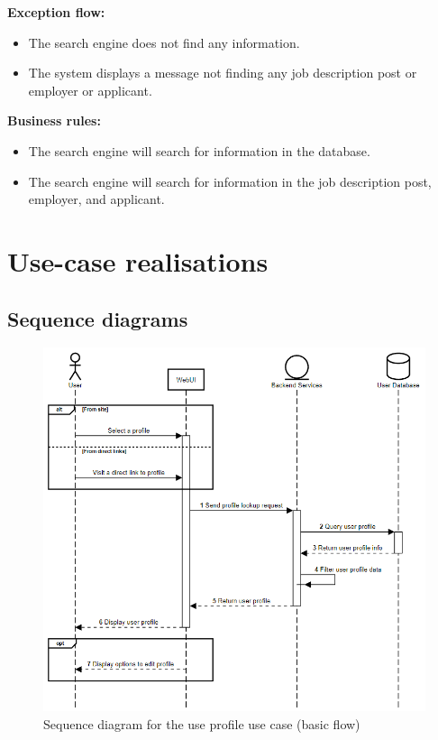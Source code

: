 \documentclass[a4paper]{article}
\begin{document}
\textbf{Exception flow:}
\begin{itemize}
  \item The search engine does not find any information.
  \item The system displays a message not finding any job description post or employer or applicant.
\end{itemize}

\textbf{Business rules:}
\begin{itemize}
  \item The search engine will search for information in the database.
  \item The search engine will search for information in the job description post, employer, and applicant.
\end{itemize}

\pagebreak
\section{Use-case realisations}
\subsection{Sequence diagrams}

\begin{figure}[H]
  \centering
  \includegraphics[width=1.0\textwidth]{view_profile.png}
  \caption{Sequence diagram for the use profile use case (basic flow)}
  \label{fig:fig2}
\end{figure}
\end{document}
